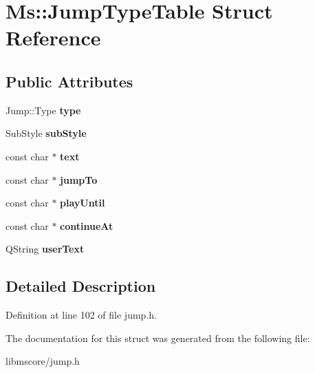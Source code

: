\hypertarget{struct_ms_1_1_jump_type_table}{}\section{Ms\+:\+:Jump\+Type\+Table Struct Reference}
\label{struct_ms_1_1_jump_type_table}
\subsection*{Public Attributes}
\begin{DoxyCompactItemize}
\item 
\mbox{\label{struct_ms_1_1_jump_type_table_a4095a58cb0abb2547d21e29c1737ced7}} 
Jump\+::\+Type {\bfseries type}
\item 
\mbox{\label{struct_ms_1_1_jump_type_table_a9de1714e8728ac7ee9c9bf14ea005fd2}} 
Sub\+Style {\bfseries sub\+Style}
\item 
\mbox{\label{struct_ms_1_1_jump_type_table_acbc9b98537e994f23cd8cbac9d23f5cb}} 
const char $\ast$ {\bfseries text}
\item 
\mbox{\label{struct_ms_1_1_jump_type_table_aaae53fd101df3b38a08611ba6e0c894b}} 
const char $\ast$ {\bfseries jump\+To}
\item 
\mbox{\label{struct_ms_1_1_jump_type_table_afef440d2ef29c1e209ef06500a5d1a4f}} 
const char $\ast$ {\bfseries play\+Until}
\item 
\mbox{\label{struct_ms_1_1_jump_type_table_aa190baf50dbe0f5abf1aa2cbcc665f8a}} 
const char $\ast$ {\bfseries continue\+At}
\item 
\mbox{\label{struct_ms_1_1_jump_type_table_a5a2ebaebc85a8b2602c77a0023d2269e}} 
Q\+String {\bfseries user\+Text}
\end{DoxyCompactItemize}


\subsection{Detailed Description}


Definition at line 102 of file jump.\+h.



The documentation for this struct was generated from the following file\+:\begin{DoxyCompactItemize}
\item 
libmscore/jump.\+h\end{DoxyCompactItemize}
